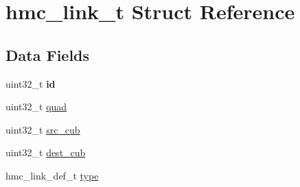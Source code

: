 \hypertarget{structhmc__link__t}{\section{hmc\-\_\-link\-\_\-t Struct Reference}
\label{structhmc__link__t}
}
\subsection*{Data Fields}
\begin{DoxyCompactItemize}
\item 
\hypertarget{structhmc__link__t_a9efacf94edff93c170cfcc6f8e342a52}{uint32\-\_\-t {\bfseries id}}\label{structhmc__link__t_a9efacf94edff93c170cfcc6f8e342a52}

\item 
uint32\-\_\-t \hyperlink{structhmc__link__t_afb76b04d4e00b7d2f427b366f74d93f7}{quad}
\item 
uint32\-\_\-t \hyperlink{structhmc__link__t_a79d6284c61c12019421d79dd355cb461}{src\-\_\-cub}
\item 
uint32\-\_\-t \hyperlink{structhmc__link__t_addb5467768ff0fc1f58b06b5db27050f}{dest\-\_\-cub}
\item 
hmc\-\_\-link\-\_\-def\-\_\-t \hyperlink{structhmc__link__t_a5aa05931275099889daaab6641a2844d}{type}
\end{DoxyCompactItemize}


